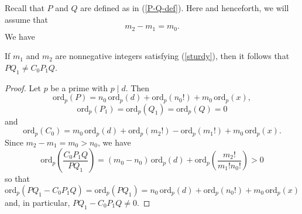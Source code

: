 
Recall that $P$ and $Q$ are defined as in (\ref{P-Q-def}). Here and henceforth, we will assume that 
\begin{equation} \label{sturdy}
m_2-m_1=m_0. 
\end{equation}
We have
\begin{lemma} \label{pumpkin}
If  $m_1$ and $m_2$ are nonnegative integers satisfying (\ref{sturdy}),  then it follows that $PQ_1 \neq C_0 P_1 Q$.
\end{lemma}

\begin{proof}
Let $p$ be a prime with $p \mid d$. 
Then
$$
\mbox{ord}_p (P) = n_0 \, \mbox{ord}_p (d)  + \mbox{ord}_p (n_0!) + m_0 \, \mbox{ord}_p (x),
$$
$$
\mbox{ord}_p (P_1) = \mbox{ord}_p (Q_1) = \mbox{ord}_p (Q) = 0
$$
and
$$
\mbox{ord}_p (C_0) = m_0 \, \mbox{ord}_p (d)  + \mbox{ord}_p (m_2!)  - \mbox{ord}_p (m_1!) + m_0 \, \mbox{ord}_p (x).
$$
Since $m_2 - m_1 = m_0 > n_0$, 
we have
$$
\mbox{ord}_p \left( \frac{C_0P_1 Q}{P Q_1} \right) = (m_0-n_0)  \, \mbox{ord}_p (d)  + \mbox{ord}_p \left( \frac{m_2!}{m_1! n_0!} \right) > 0
$$
so that 
$$
\mbox{ord}_p (P Q_1 - C_0 P_1 Q) = \mbox{ord}_p (P Q_1) = n_0 \, \mbox{ord}_p (d)  + \mbox{ord}_p (n_0!) + m_0 \, \mbox{ord}_p (x)
$$
and, in particular, $P Q_1 - C_0 P_1 Q \neq 0$.

\end{proof}



